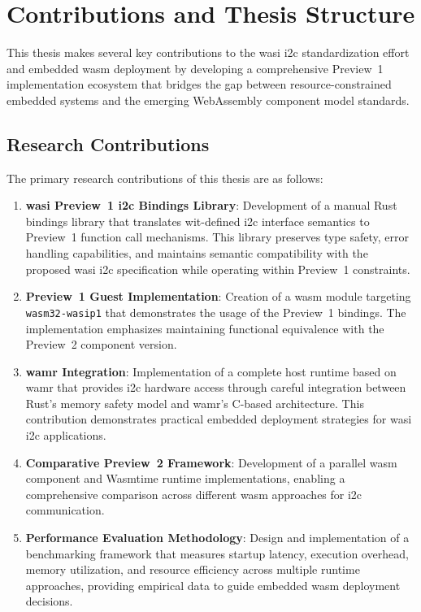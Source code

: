 \section{Contributions and Thesis Structure}
\label{sec:contributions-structure}

This thesis makes several key contributions to the \acrshort{wasi} \acrshort{i2c} standardization effort and embedded \acrshort{wasm} deployment by developing a comprehensive Preview~1 implementation ecosystem that bridges the gap between resource-constrained embedded systems and the emerging WebAssembly component model standards.

\subsection{Research Contributions}
\label{subsec:research-contributions}

The primary research contributions of this thesis are as follows:

\begin{enumerate}
    \item \textbf{\acrshort{wasi} Preview~1 \acrshort{i2c} Bindings Library}: Development of a manual Rust bindings library that translates \acrshort{wit}-defined \acrshort{i2c} interface semantics to Preview~1 function call mechanisms. This library preserves type safety, error handling capabilities, and maintains semantic compatibility with the proposed \acrshort{wasi} \acrshort{i2c} specification while operating within Preview~1 constraints.

    \item \textbf{Preview~1 Guest Implementation}: Creation of a \acrshort{wasm} module targeting \sloppy\texttt{wasm32-wasip1} that demonstrates the usage of the Preview~1 bindings. The implementation emphasizes maintaining functional equivalence with the Preview~2 component version.

    \item \textbf{\acrshort{wamr} Integration}: Implementation of a complete host runtime based on \acrshort{wamr} that provides \acrshort{i2c} hardware access through careful integration between Rust's memory safety model and \acrshort{wamr}'s C-based architecture. This contribution demonstrates practical embedded deployment strategies for \acrshort{wasi} \acrshort{i2c} applications.

    \item \textbf{Comparative Preview~2 Framework}: Development of a parallel \acrshort{wasm} component and Wasmtime runtime implementations, enabling a comprehensive comparison across different \acrshort{wasm} approaches for \acrshort{i2c} communication.

    \item \textbf{Performance Evaluation Methodology}: Design and implementation of a benchmarking framework that measures startup latency, execution overhead, memory utilization, and resource efficiency across multiple runtime approaches, providing empirical data to guide embedded \acrshort{wasm} deployment decisions.
\end{enumerate}

